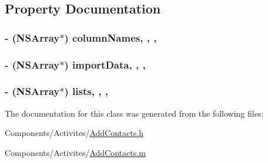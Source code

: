 \subsection{Property Documentation}
\hypertarget{interface_add_contacts_a5fda7a6b8014bccf3db9e6062c64e1b1}{
\subsubsection[{column\-Names}]{\setlength{\rightskip}{0pt plus 5cm}-\/ (N\-S\-Array$\ast$) column\-Names\hspace{0.3cm}{\ttfamily [read]}, {\ttfamily [write]}, {\ttfamily [nonatomic]}, {\ttfamily [strong]}}}\label{interface_add_contacts_a5fda7a6b8014bccf3db9e6062c64e1b1}
\hypertarget{interface_add_contacts_a78dbd515fd874bae9cfb9e3281440526}{
\subsubsection[{import\-Data}]{\setlength{\rightskip}{0pt plus 5cm}-\/ (N\-S\-Array$\ast$) import\-Data\hspace{0.3cm}{\ttfamily [read]}, {\ttfamily [write]}, {\ttfamily [nonatomic]}, {\ttfamily [strong]}}}\label{interface_add_contacts_a78dbd515fd874bae9cfb9e3281440526}
\hypertarget{interface_add_contacts_a5e31df8915ef05031b2856e54c0bbca6}{
\subsubsection[{lists}]{\setlength{\rightskip}{0pt plus 5cm}-\/ (N\-S\-Array$\ast$) lists\hspace{0.3cm}{\ttfamily [read]}, {\ttfamily [write]}, {\ttfamily [nonatomic]}, {\ttfamily [strong]}}}\label{interface_add_contacts_a5e31df8915ef05031b2856e54c0bbca6}


The documentation for this class was generated from the following files\-:\begin{DoxyCompactItemize}
\item 
Components/\-Activites/\hyperlink{_add_contacts_8h}{Add\-Contacts.\-h}\item 
Components/\-Activites/\hyperlink{_add_contacts_8m}{Add\-Contacts.\-m}\end{DoxyCompactItemize}
